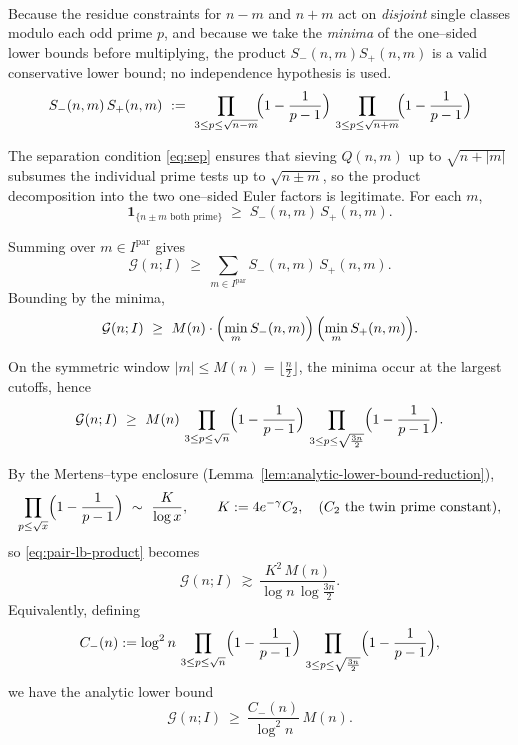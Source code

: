 \documentclass[11pt]{article}
\makeatletter
\theoremstyle{inline}
\theoremstyle{break}
\renewenvironment{proof}[1][\proofname]{%
  \par\pushQED{\qed}%
  \normalfont \topsep6\p@\@plus6\p@\relax
  \trivlist
  \item[\hskip\labelsep
        \itshape
    #1\@addpunct{.}]\mbox{}\\  %
}{%
  \popQED\endtrivlist\@endpefalse
}
\theoremstyle{break}
\theoremstyle{break}
\theoremstyle{break}
\theoremstyle{break}
\theoremstyle{break}
\theoremstyle{break}
\theoremstyle{inline}
\newcommand{\CminusProduct}{C_{-}}
\makeatother
\begin{document}
\begin{proof}
Because the residue constraints for \(n-m\) and \(n+m\) act on \emph{disjoint} single classes modulo each odd prime \(p \), and because we take the \emph{minima} of the one–sided lower bounds before multiplying, the product \(S_-(n,m)S_+(n,m)\) is a valid conservative lower bound; no independence hypothesis is used.
\begin{equation}
S_{-}(n,m)\,S_{+}(n,m)
\ :=\
\prod_{3\le p\le \sqrt{n-m}}\!\Bigl(1-\frac{1}{p-1}\Bigr)\,
\prod_{3\le p\le \sqrt{n+m}}\!\Bigl(1-\frac{1}{p-1}\Bigr)
\end{equation}

The separation condition \eqref{eq:sep} ensures that sieving \(Q(n,m)\) up to \(\sqrt{n+|m|}\) subsumes the individual prime tests up to \(\sqrt{n\pm m}\), so the product decomposition into the two one–sided Euler factors is legitimate.  For each \(m\),
\begin{equation}
\mathbf{1}_{\{\text{\(n\pm m\) both prime}\}}\;\ge\;S_-(n,m)\,S_+(n,m).
\end{equation}

Summing over \(m\in I^{\mathrm{par}}\) gives
\begin{equation}
\mathcal G(n;I)\ \ge\ \sum_{m\in I^{\mathrm{par}}} S_-(n,m)\,S_+(n,m).
\end{equation}
Bounding by the minima,
\begin{equation}
\mathcal G(n;I)\ \ge\
M(n)\cdot\Bigl(\min_{m}S_-(n,m)\Bigr)\,\Bigl(\min_{m}S_+(n,m)\Bigr).
\end{equation}

On the symmetric window \(|m|\le M(n)=\lfloor \frac{n}{2}\rfloor\), the minima
occur at the largest cutoffs, hence
\begin{equation}\label{eq:pair-lb-product}
\mathcal G(n;I)\ \ge\
M(n)\,
\prod_{3\le p\le \sqrt n}\Bigl(1-\frac{1}{p-1}\Bigr)\,
\prod_{3\le p\le \sqrt{\frac{3n}{2}}}\Bigl(1-\frac{1}{p-1}\Bigr).
\end{equation}

\medskip
\noindent
By the Mertens--type enclosure (Lemma~\ref{lem:analytic-lower-bound-reduction}),
\begin{equation}
\prod_{p\le \sqrt x}\Bigl(1-\frac{1}{p-1}\Bigr)\ \sim\ \frac{K}{\log x},
\qquad K:=4e^{-\gamma}C_2,\quad (C_2 \text{ the twin prime constant}),
\end{equation}
so \eqref{eq:pair-lb-product} becomes
\begin{equation}
\mathcal G(n;I)\ \gtrsim\
\frac{K^2\,M(n)}{\log n\,\log{\frac{3n}{2}}}.
\end{equation}
Equivalently, defining
\begin{equation}\label{eq:Cminus}
\CminusProduct(n)
:=\log^2 n\,
\prod_{3\le p\le \sqrt n}\Bigl(1-\frac{1}{p-1}\Bigr)\,
\prod_{3\le p\le \sqrt{\frac{3n}{2}}}\Bigl(1-\frac{1}{p-1}\Bigr),
\end{equation}
we have the analytic lower bound
\begin{equation}
\mathcal G(n;I)\ \ge\ \frac{\CminusProduct(n)}{\log^2 n}\,M(n).
\end{equation}


\end{proof}
\end{document}
